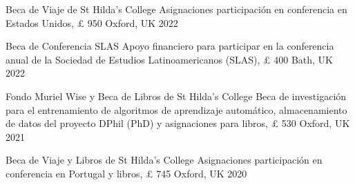 





\vspace{1mm}

\begin{cvhonors}
\cvhonor
{Beca de Viaje de St Hilda's College} 
{Asignaciones participación en conferencia en Estados Unidos, {\pounds} 950} 
{Oxford, UK}
{2022}
\end{cvhonors}

\vspace{1mm}

\begin{cvhonors}
\cvhonor
{Beca de Conferencia SLAS} 
{Apoyo financiero para participar en la conferencia anual de la Sociedad de Estudios Latinoamericanos (SLAS), {\pounds} 400}
{Bath, UK}
{2022}
\end{cvhonors}

\vspace{1mm}

\begin{cvhonors}
\cvhonor
{Fondo Muriel Wise y Beca de Libros de St Hilda's College} 
{Beca de investigación para el entrenamiento de algoritmos de aprendizaje automático, almacenamiento de datos del proyecto DPhil (PhD) y
asignaciones para libros, {\pounds} 530} 
{Oxford, UK}
{2021}
\end{cvhonors}

\vspace{1mm}

\begin{cvhonors}
\cvhonor
{Beca de Viaje y Libros de St Hilda's College} 
{Asignaciones participación en conferencia en Portugal y libros, {\pounds} 745} 
{Oxford, UK}
{2020}
\end{cvhonors}

